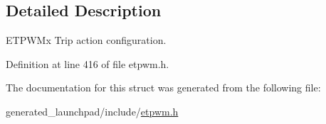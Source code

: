 \subsection{Detailed Description}
E\+T\+P\+W\+Mx Trip action configuration. 

Definition at line 416 of file etpwm.\+h.



The documentation for this struct was generated from the following file\+:\begin{DoxyCompactItemize}
\item 
generated\+\_\+launchpad/include/\mbox{\hyperlink{etpwm_8h}{etpwm.\+h}}\end{DoxyCompactItemize}

